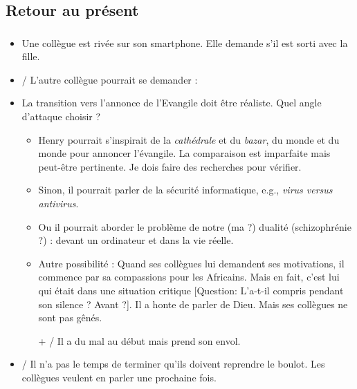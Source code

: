 	\subsection{Retour au présent}
	
	\begin{frame}[allowframebreaks]
	\frametitle{\insertsubsection}
	
		\begin{itemize}
		\item \humour{} Une collègue est rivée sur son smartphone. Elle demande
		s'il est sorti avec la fille.
		\item \histoire{}/\evang{} L'autre collègue pourrait se demander :
		\item \evang{} La transition vers l'annonce de l'Evangile doit
			être réaliste. Quel angle d'attaque choisir ?
			\begin{itemize}
			\item Henry pourrait s'inspirait de la \emph{cathédrale} et du
			\emph{bazar}, du monde  et du monde  pour
			annoncer l'évangile. La comparaison est imparfaite mais
			peut-être pertinente. Je dois faire des recherches pour vérifier.
			\item Sinon, il pourrait parler de la sécurité informatique, e.g.,
			\emph{virus versus antivirus}.
			\item Ou il pourrait aborder le problème de notre (ma ?) dualité 
			(schizophrénie ?) : devant un ordinateur et dans la vie réelle.
			\item Autre possibilité :
			Quand ses collègues lui demandent ses motivations,
			il commence par sa compassions pour les Africains.
			Mais en fait, c'est lui qui était dans une situation
			critique [Question: L'a-t-il compris pendant son silence ?
			Avant ?]. Il a honte de parler de Dieu. Mais ses collègues
			ne sont pas gênés.
			\item[+] \mes{}/\drama{} Il a du mal au début mais prend son envol.
			\end{itemize}
		\item \mes{}/\histoire{} Il n'a pas le temps de terminer qu'ils 
		doivent reprendre le boulot. Les collègues veulent en parler une
		prochaine fois.
		\end{itemize}
	
	\end{frame}